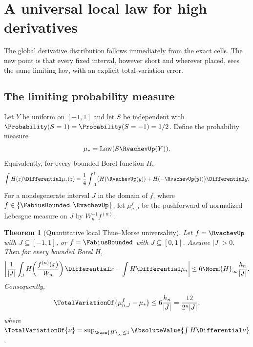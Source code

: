 \documentclass[11pt,a4paper]{article}
\newtheorem{theorem}{Theorem}[section]
\theoremstyle{definition}
\theoremstyle{remark}
\begin{document}
\section{A universal local law for high derivatives}
\label{sec:local-law}

The global derivative distribution follows immediately from the exact cells.  The
new point is that every fixed interval, however short and wherever placed, sees the
same limiting law, with an explicit total-variation error.

\subsection{The limiting probability measure}

Let $Y$ be uniform on $[-1,1]$ and let $S$ be independent with
$\Probability(S=1)=\Probability(S=-1)=1/2$.  Define the probability measure
\begin{equation}
  \mu_*=\operatorname{Law}(S\RvachevUp(Y)).
  \label{eq:mu-star}
\end{equation}
Equivalently, for every bounded Borel function $H$,
\begin{equation}
  \int H(z)\Differential\mu_*(z)
  =\frac14\int_{-1}^{1}\bigl(H(\RvachevUp(y))+H(-\RvachevUp(y))\bigr)\Differential y.
  \label{eq:mu-star-test}
\end{equation}
For a nondegenerate interval $J$ in the domain of $f$, where
$f\in\{\FabiusBounded,\RvachevUp\}$, let $\mu_{n,J}^{f}$ be the pushforward of normalized Lebesgue
measure on $J$ by $W_n^{-1}f^{(n)}$.

\begin{theorem}[Quantitative local Thue--Morse universality]
\label{thm:local-universality}
Let $f=\RvachevUp$ with $J\subseteq[-1,1]$, or $f=\FabiusBounded$ with $J\subseteq[0,1]$.
Assume $|J|>0$.  Then for every bounded Borel $H$,
\begin{equation}
 \left|
   \frac1{|J|}\int_J H\!\left(\frac{f^{(n)}(x)}{W_n}\right)\Differential x
   -\int H\Differential\mu_*
 \right|
 \le
  6\Norm{H}_\infty\frac{h_n}{|J|}.
 \label{eq:local-law-bound}
\end{equation}
Consequently,
\begin{equation}
  \TotalVariationOf{\mu_{n,J}^{f}-\mu_*}
  \le 6\frac{h_n}{|J|}
  =\frac{12}{2^n|J|},
  \label{eq:tv-bound}
\end{equation}
where
$\TotalVariationOf{\nu}
 =\sup_{\Norm{H}_\infty\le1}\AbsoluteValue{\int H\Differential\nu}$.
\end{theorem}
\end{document}
